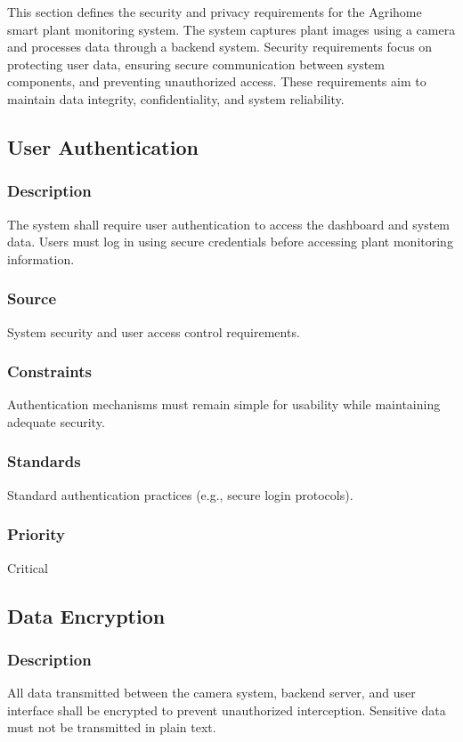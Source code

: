 

This section defines the security and privacy requirements for the Agrihome smart plant monitoring system. The system captures plant images using a camera and processes data through a backend system. Security requirements focus on protecting user data, ensuring secure communication between system components, and preventing unauthorized access. These requirements aim to maintain data integrity, confidentiality, and system reliability.

\subsection{User Authentication}
\subsubsection{Description}
The system shall require user authentication to access the dashboard and system data. Users must log in using secure credentials before accessing plant monitoring information.

\subsubsection{Source}
System security and user access control requirements.

\subsubsection{Constraints}
Authentication mechanisms must remain simple for usability while maintaining adequate security.

\subsubsection{Standards}
Standard authentication practices (e.g., secure login protocols).

\subsubsection{Priority}
Critical


\subsection{Data Encryption}
\subsubsection{Description}
All data transmitted between the camera system, backend server, and user interface shall be encrypted to prevent unauthorized interception. Sensitive data must not be transmitted in plain text.

